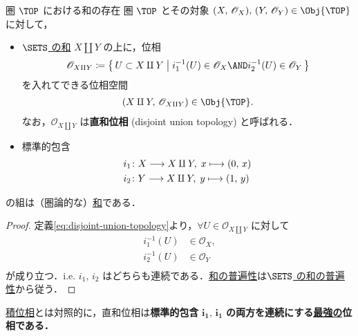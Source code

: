 \documentclass[geometry_main]{subfiles}
\begin{document}
\begin{myprop}[label=prop:sum-top]{圏 $\TOP$ における和の存在}
	圏 $\TOP$ とその対象 $\phase{X},\, \phase{Y} \in \Obj{\TOP}$ に対して，
	\begin{itemize}
		\item \hyperref[prop:sum-sets]{$\SETS$ の和} $X \amalg Y$ の上に，位相
		\begin{align}
			\label{eq:disjoint-union-topology}
			\mathscr{O}_{X\amalg Y} \coloneqq \bigl\{\, U \subset X \amalg Y \bigm| i_1^{-1}(U) \in \mathscr{O}_X \AND i_2^{-1}(U) \in \mathscr{O}_Y \,\bigr\}
		\end{align}
		を入れてできる位相空間
		\begin{align}
			(X\amalg Y,\, \mathscr{O}_{X \amalg Y}) \in \Obj{\TOP}.
		\end{align}
		なお，$\mathscr{O}_{X\amalg Y}$ は\textbf{直和位相} (disjoint union topology) と呼ばれる．
		\item 標準的包含
		\begin{align}
			i_1 &\colon X \longrightarrow X \amalg Y,\; x \longmapsto (0,\, x) \\
			i_2 &\colon Y \longrightarrow X \amalg Y,\; y \longmapsto (1,\, y)
		\end{align}
	\end{itemize}
	の組は（圏論的な）\hyperref[def:sum]{和}である．
\end{myprop}

\begin{proof}
	定義\eqref{eq:disjoint-union-topology}より，$\forall U \in \mathscr{O}_{X \amalg Y}$ に対して
	\begin{align}
		i_1^{-1}(U) &\in \mathscr{O}_X, \\
		i_2^{-1}(U) &\in \mathscr{O}_Y \\
	\end{align}
	が成り立つ．i.e. $i_1,\, i_2$ はどちらも連続である．\hyperref[cmtd:univ-sum]{和の普遍性}は\hyperref[prop:sum-sets]{$\SETS$ の和の普遍性}から従う．
\end{proof}

\begin{marker}\label{remark:sum}
	\hyperref[prop:product-top]{積位相}とは対照的に，直和位相は\textbf{標準的包含} $\bm{i_1},\, \bm{i_1}$ \textbf{の両方を連続にする\hyperref[def.intensity_topo]{最強の}位相である．}
\end{marker}
\end{document}
